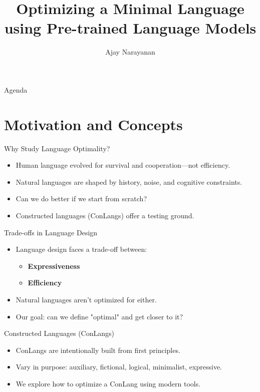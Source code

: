 \documentclass{beamer}
\title{Optimizing a Minimal Language using Pre-trained Language Models}
\date{}
\author{Ajay Narayanan}
\institute{Technical University of Munich}
\begin{document}
  \maketitle

\begin{frame}{Agenda}
	\tableofcontents
\end{frame}

\section{Motivation and Concepts}

\begin{frame}{Why Study Language Optimality?}
	\begin{itemize}
		\item Human language evolved for survival and cooperation—not efficiency.
		\item Natural languages are shaped by history, noise, and cognitive constraints.
		\item Can we do better if we start from scratch?
		\item Constructed languages (ConLangs) offer a testing ground.
	\end{itemize}
\end{frame}

\begin{frame}{Trade-offs in Language Design}
	\begin{itemize}
		\item Language design faces a trade-off between:
		\begin{itemize}
			\item \textbf{Expressiveness}
			\item \textbf{Efficiency}
		\end{itemize}
		\item Natural languages aren't optimized for either.
		\item Our goal: can we define "optimal" and get closer to it?
	\end{itemize}
\end{frame}

\begin{frame}{Constructed Languages (ConLangs)}
	\begin{itemize}
		\item ConLangs are intentionally built from first principles.
		\item Vary in purpose: auxiliary, fictional, logical, minimalist, expressive.
		\item We explore how to optimize a ConLang using modern tools.
	\end{itemize}
\end{frame}
\end{document}
